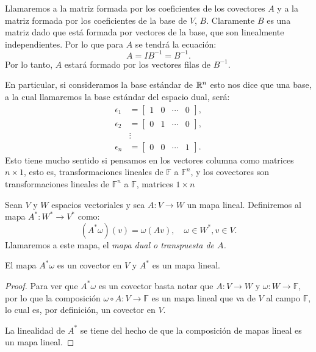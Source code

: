 \begin{example}
	Llamaremos a la matriz formada por los coeficientes de los covectores $A$ y a la matriz formada por los coeficientes de la base de $V$, $B$. Claramente $B$ es una matriz dado que está formada por vectores de la base, que son linealmente independientes. Por lo que para $A$ se tendrá la ecuación:
	\[
		A = IB^{-1} = B^{-1}.
	\]
	Por lo tanto, $A$ estará formado por los vectores filas de $B^{-1}$.

	En particular, si consideramos la base estándar de $\mathbb{R}^n$ esto nos dice que una base, a la cual llamaremos la base estándar del espacio dual, será:
	\begin{align*}
		\epsilon_1 & = \begin{bmatrix} 1 & 0 & \cdots & 0\end{bmatrix}, \\
		\epsilon_2 & = \begin{bmatrix} 0 & 1 & \cdots & 0\end{bmatrix}, \\
		           & \vdots                                             \\
		\epsilon_n & = \begin{bmatrix} 0 & 0 & \cdots & 1\end{bmatrix}.
	\end{align*}
	Esto tiene mucho sentido si pensamos en los vectores columna como matrices $n \times 1$, esto es, transformaciones lineales de $\mathbb{F}$ a $\mathbb{F}^n$, y los covectores son transformaciones lineales de $\mathbb{F}^n$ a $\mathbb{F}$, matrices $1 \times n$
\end{example}

\begin{definition}
	Sean $V$ y $W$ espacios vectoriales y sea $A: V \to W$ un mapa lineal. Definiremos al mapa $A^*: W^* \to V^*$ como:
	\[(A^{*}\omega)(v) = \omega(Av), \quad \omega \in W^{*}, v \in V.\]
	Llamaremos a este mapa, el \it{mapa dual} o \it{transpuesta de $A$}.
\end{definition}

\begin{lemma}
	El mapa $A^{*}\omega$ es un covector en $V$ y $A^{*}$ es un mapa lineal.
\end{lemma}

\begin{proof}
	Para ver que $A^{*}\omega$ es un covector basta notar que $A: V \to W$ y $\omega: W \to \mathbb{F}$, por lo que la composición $\omega \circ A: V \to \mathbb{F}$ es un mapa lineal que va de $V$ al campo $\mathbb{F}$, lo cual es, por definición, un covector en $V$.

	La linealidad de $A^{*}$ se tiene del hecho de que la composición de mapas lineal es un mapa lineal.
\end{proof}

